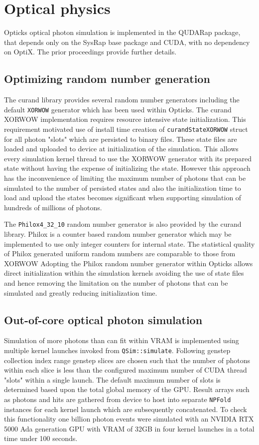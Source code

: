 \documentclass{webofc}
\begin{document}


\section{Optical physics}%
%
Opticks optical photon simulation is implemented in the QUDARap package, 
that depends only on the SysRap base package and CUDA, with no dependency on OptiX. 
The prior proceedings\cite{chep2023} provide further details. 
%
\subsection{Optimizing random number generation}
%
The curand library provides several random number generators
including the default {\tt XORWOW} generator which has been used within Opticks.  
The curand XORWOW implementation requires resource intensive state initialization.
This requirement motivated use of install time creation of {\tt curandStateXORWOW} 
struct for all photon "slots" which are persisted to binary files. 
These state files are loaded and uploaded to device at initialization 
of the simulation. This allows every simulation kernel thread 
to use the XORWOW generator with its prepared state without having the expense of 
initializing the state. However this approach has the inconvenience of 
limiting the maximum number of photons that can be simulated to the number
of persisted states and also the initialization time to load and upload the 
states becomes significant when supporting simulation of hundreds of millions 
of photons. 

The {\tt Philox4\_32\_10} random number generator is also provided by the curand library. 
Philox is a counter based random number generator which may be implemented to 
use only integer counters for internal state. 
The statistical quality of Philox generated uniform random numbers are comparable to those from XORWOW\cite{curandRNGTest} 
Adopting the Philox random number generator within Opticks allows direct initialization within
the simulation kernels avoiding the use of state files and hence removing the 
limitation on the number of photons that can be simulated and greatly reducing 
initialization time. 
%
\subsection{Out-of-core optical photon simulation}
%
Simulation of more photons than can fit within VRAM is implemented
using multiple kernel launches invoked from {\tt QSim::simulate}. 
Following genstep collection index range genstep slices are chosen 
such that the number of photons within each slice is less than 
the configured maximum number of CUDA thread "slots" within a single launch.
The default maximum number of slots is determined based upon the total
global memory of the GPU. Result arrays such as photons and hits are gathered
from device to host into separate {\tt NPFold} instances for each kernel launch 
which are subsequently concatenated. To check this functionality 
one billion photon events were simulated with an NVIDIA RTX 5000 Ada 
generation GPU with VRAM of 32GB in four kernel launches 
in a total time under 100 seconds. 
%
%
\end{document}

